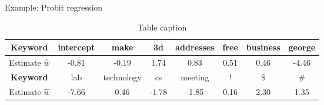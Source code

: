 \documentclass[final]{beamer}
\newlength{\twocolwid}
\begin{document}
\begin{frame}[t]
\begin{columns}[t]
\begin{column}{\twocolwid}
\begin{block}{Example: Probit regression}
    
  

\begin{table}
\vspace{2ex}
\begin{tabular}{c | c | c | c | c | c | c | c}
\toprule
\textbf{Keyword} & intercept & make & 3d & addresses & free & business & george \\
\midrule
Estimate $\widehat w$ & -0.81 & -0.19 & 1.74 & 0.83 & 0.51 & 0.46 & -4.46\\
\midrule
\textbf{Keyword} & lab & technology & cs & meeting & ! & \$ & \# \\
\midrule
Estimate $\widehat w$ & -7.66 & 0.46 & -1.78 & -1.85 & 0.16 & 2.30 & 1.35\\
\bottomrule
\end{tabular}
~
\caption{Table caption}
\end{table}




\end{block}




%
%
%



\end{column}
\end{columns}
\end{frame}
\end{document}
